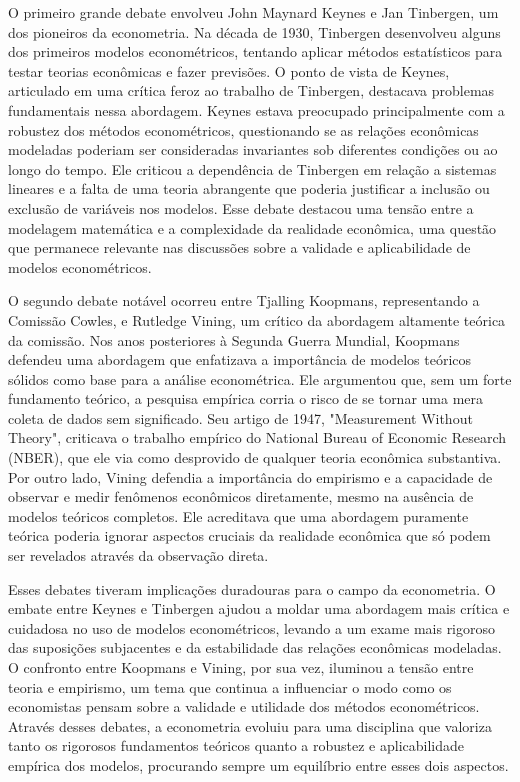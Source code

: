 \documentclass[a4paper,12pt]{article}[abntex2]
\begin{document}
O primeiro grande debate envolveu John Maynard Keynes e Jan Tinbergen, um dos pioneiros da econometria. Na década de 1930, Tinbergen desenvolveu alguns dos primeiros modelos econométricos, tentando aplicar métodos estatísticos para testar teorias econômicas e fazer previsões. O ponto de vista de Keynes, articulado em uma crítica feroz ao trabalho de Tinbergen, destacava problemas fundamentais nessa abordagem. Keynes estava preocupado principalmente com a robustez dos métodos econométricos, questionando se as relações econômicas modeladas poderiam ser consideradas invariantes sob diferentes condições ou ao longo do tempo. Ele criticou a dependência de Tinbergen em relação a sistemas lineares e a falta de uma teoria abrangente que poderia justificar a inclusão ou exclusão de variáveis nos modelos. Esse debate destacou uma tensão entre a modelagem matemática e a complexidade da realidade econômica, uma questão que permanece relevante nas discussões sobre a validade e aplicabilidade de modelos econométricos.

O segundo debate notável ocorreu entre Tjalling Koopmans, representando a Comissão Cowles, e Rutledge Vining, um crítico da abordagem altamente teórica da comissão. Nos anos posteriores à Segunda Guerra Mundial, Koopmans defendeu uma abordagem que enfatizava a importância de modelos teóricos sólidos como base para a análise econométrica. Ele argumentou que, sem um forte fundamento teórico, a pesquisa empírica corria o risco de se tornar uma mera coleta de dados sem significado. Seu artigo de 1947, "Measurement Without Theory", criticava o trabalho empírico do National Bureau of Economic Research (NBER), que ele via como desprovido de qualquer teoria econômica substantiva. Por outro lado, Vining defendia a importância do empirismo e a capacidade de observar e medir fenômenos econômicos diretamente, mesmo na ausência de modelos teóricos completos. Ele acreditava que uma abordagem puramente teórica poderia ignorar aspectos cruciais da realidade econômica que só podem ser revelados através da observação direta.

Esses debates tiveram implicações duradouras para o campo da econometria. O embate entre Keynes e Tinbergen ajudou a moldar uma abordagem mais crítica e cuidadosa no uso de modelos econométricos, levando a um exame mais rigoroso das suposições subjacentes e da estabilidade das relações econômicas modeladas. O confronto entre Koopmans e Vining, por sua vez, iluminou a tensão entre teoria e empirismo, um tema que continua a influenciar o modo como os economistas pensam sobre a validade e utilidade dos métodos econométricos. Através desses debates, a econometria evoluiu para uma disciplina que valoriza tanto os rigorosos fundamentos teóricos quanto a robustez e aplicabilidade empírica dos modelos, procurando sempre um equilíbrio entre esses dois aspectos.
\end{document}
